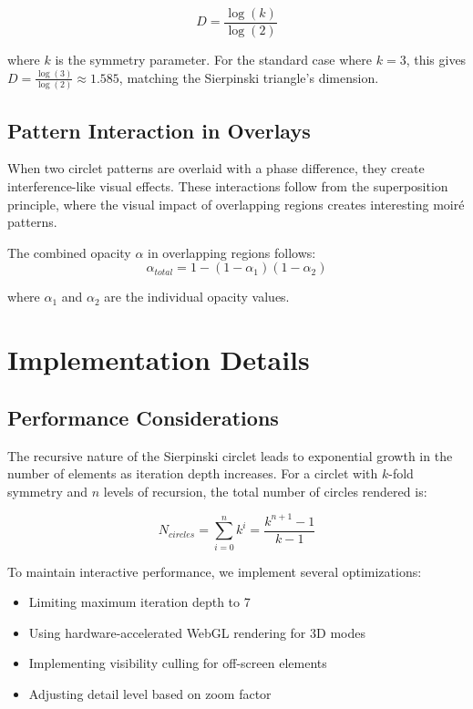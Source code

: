 \documentclass[12pt,a4paper]{article}
\begin{document}
\begin{equation}
D = \frac{\log(k)}{\log(2)}
\end{equation}

where $k$ is the symmetry parameter. For the standard case where $k=3$, this gives $D = \frac{\log(3)}{\log(2)} \approx 1.585$, matching the Sierpinski triangle's dimension.

\subsection{Pattern Interaction in Overlays}
When two circlet patterns are overlaid with a phase difference, they create interference-like visual effects. These interactions follow from the superposition principle, where the visual impact of overlapping regions creates interesting moiré patterns.

The combined opacity $\alpha$ in overlapping regions follows:
\begin{equation}
\alpha_{total} = 1 - (1-\alpha_1)(1-\alpha_2)
\end{equation}

where $\alpha_1$ and $\alpha_2$ are the individual opacity values.

\section{Implementation Details}

\subsection{Performance Considerations}
The recursive nature of the Sierpinski circlet leads to exponential growth in the number of elements as iteration depth increases. For a circlet with $k$-fold symmetry and $n$ levels of recursion, the total number of circles rendered is:

\begin{equation}
N_{circles} = \sum_{i=0}^{n} k^i = \frac{k^{n+1} - 1}{k - 1}
\end{equation}

To maintain interactive performance, we implement several optimizations:

\begin{itemize}
    \item Limiting maximum iteration depth to 7
    \item Using hardware-accelerated WebGL rendering for 3D modes
    \item Implementing visibility culling for off-screen elements
    \item Adjusting detail level based on zoom factor
\end{itemize}
\end{document}
